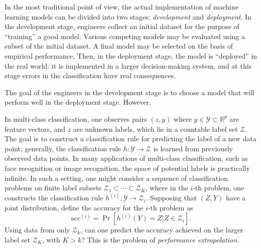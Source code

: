 \documentclass[12pt]{article}
\begin{document}
In the most traditional point of view, the actual implementation of
machine learning models can be divided into two stages:
\emph{development} and \emph{deployment}.  In the development stage,
engineers collect an initial dataset for the purpose of ``training'' a
good model.  Various competing models may be evaluated using a subset
of the initial dataset.  A final model may be selected on the basis of
empirical performance.  Then, in the deployment stage, the model is
``deployed'' in the real world: it is implemented in a larger
decision-making system, and at this stage errors in the classification
have real consequences.

The goal of the engineers in the development stage is to choose a
model that will perform well in the deployment stage.  However, 





In multi-class classification, one observes pairs $(z, y)$ where $y
\in \mathcal{Y} \subset \mathbb{R}^p$ are feature vectors, and $z$ are
unknown labels, which lie in a countable label set $\mathcal{Z}$.  The
goal is to construct a classification rule for predicting the label of
a new data point; generally, the classification rule $h: \mathcal{Y}
\to \mathcal{Z}$ is learned from previously observed data points.  In
many applications of multi-class classification, such as face
recognition or image recognition, the space of potential labels is
practically infinite.  In such a setting, one might consider a
sequence of classification problems on finite label subsets
$\mathcal{Z}_1 \subset \cdots \subset \mathcal{Z}_K$, where in the
$i$-th problem, one constructs the classification rule
$h^{(i)}:\mathcal{Y} \to \mathcal{Z}_i$.  Supposing that $(Z, Y)$ have
a joint distribution, define the accuracy for the $i$-th problem as
\[
\text{acc}^{(i)} = \Pr[h^{(i)}(Y) = Z|Z \in \mathcal{Z}_i].
\]
Using data from only $\mathcal{Z}_k$, can one predict the accuracy achieved on the larger label set $\mathcal{Z}_K$, with $K> k$?  This is the problem of \emph{performance extrapolation}.
\end{document}
